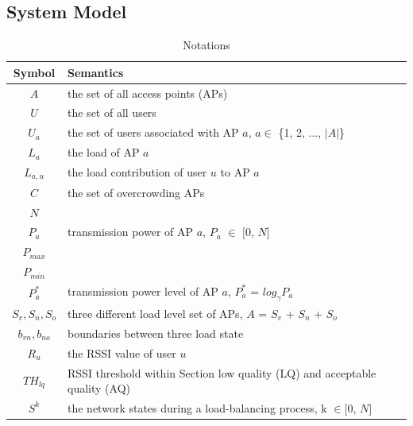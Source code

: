 

\subsection{System Model}\label{section:3.1}

\begin{table}[tbp] 
    \normalsize
    \caption{Notations} 
    \begin{center} 
        \label{tab: Notations} 
        \begin{tabularx}{\linewidth}{| c | X | } 
            \hline \textbf{Symbol}  & \textbf{Semantics} \\ 
            \hline $A$              & the set of all access points (APs) \\ 
            \hline $U$              & the set of all users \\ 
            \hline $U_a$            & the set of users associated with AP $a$, $a \in$ \{1, 2, ..., $|A|$\} \\ 
            \hline $L_a$            & the load of AP $a$ \\ 
            \hline $L_{a,u}$        & the load contribution of user $u$ to AP $a$ \\ 
            \hline $C$              & the set of overcrowding APs \\ 
            \hline $N$              & \\
            \hline $P_a$            & transmission power of AP $a$, $P_a$ $\in$ $[$0, $N]$ \\ 
            \hline $P_{max}$        & \\
            \hline $P_{min}$        & \\
            \hline $P^{*}_{a}$      & transmission power level of AP $a$, $P^{*}_a$ = $log_\gamma P_a$ \\ 
            \hline $S_v, S_n, S_o$  & three different load level set of APs, $A$ = $S_v$ + $S_n$ + $S_o$ \\ 
            \hline $b_{vn}, b_{no}$ & boundaries between three load state \\ 
            \hline $R_u$            & the RSSI value of user $u$ \\ 
            \hline $TH_{lq}$        & RSSI threshold within Section low quality (LQ) and acceptable quality (AQ) \\ 
            \hline $S^k$            & the network states during a load-balancing process, k $\in [$0, $N]$ \\ 
            \hline 
        \end{tabularx} 
    \end{center} 
\end{table}

